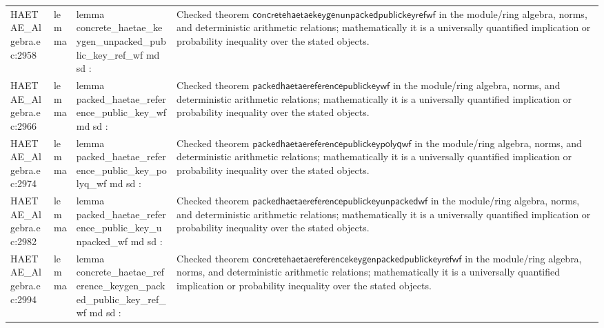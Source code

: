 \documentclass[10pt]{article}
\begin{document}
\begin{longtable}{L{0.11\textwidth}L{0.055\textwidth}L{0.385\textwidth}L{0.41\textwidth}}
HAETAE\_\allowbreak{}Algebra.\allowbreak{}ec:\allowbreak{}2958 & lemma & {\ttfamily\scriptsize lemma concrete\_\allowbreak{}haetae\_\allowbreak{}keygen\_\allowbreak{}unpacked\_\allowbreak{}public\_\allowbreak{}key\_\allowbreak{}ref\_\allowbreak{}wf md sd :} & Checked theorem $\mathsf{concretehaetaekeygenunpackedpublickeyrefwf}$ in the module/ring algebra, norms, and deterministic arithmetic relations; mathematically it is a universally quantified implication or probability inequality over the stated objects. \\
HAETAE\_\allowbreak{}Algebra.\allowbreak{}ec:\allowbreak{}2966 & lemma & {\ttfamily\scriptsize lemma packed\_\allowbreak{}haetae\_\allowbreak{}reference\_\allowbreak{}public\_\allowbreak{}key\_\allowbreak{}wf md sd :} & Checked theorem $\mathsf{packedhaetaereferencepublickeywf}$ in the module/ring algebra, norms, and deterministic arithmetic relations; mathematically it is a universally quantified implication or probability inequality over the stated objects. \\
HAETAE\_\allowbreak{}Algebra.\allowbreak{}ec:\allowbreak{}2974 & lemma & {\ttfamily\scriptsize lemma packed\_\allowbreak{}haetae\_\allowbreak{}reference\_\allowbreak{}public\_\allowbreak{}key\_\allowbreak{}polyq\_\allowbreak{}wf md sd :} & Checked theorem $\mathsf{packedhaetaereferencepublickeypolyqwf}$ in the module/ring algebra, norms, and deterministic arithmetic relations; mathematically it is a universally quantified implication or probability inequality over the stated objects. \\
HAETAE\_\allowbreak{}Algebra.\allowbreak{}ec:\allowbreak{}2982 & lemma & {\ttfamily\scriptsize lemma packed\_\allowbreak{}haetae\_\allowbreak{}reference\_\allowbreak{}public\_\allowbreak{}key\_\allowbreak{}unpacked\_\allowbreak{}wf md sd :} & Checked theorem $\mathsf{packedhaetaereferencepublickeyunpackedwf}$ in the module/ring algebra, norms, and deterministic arithmetic relations; mathematically it is a universally quantified implication or probability inequality over the stated objects. \\
HAETAE\_\allowbreak{}Algebra.\allowbreak{}ec:\allowbreak{}2994 & lemma & {\ttfamily\scriptsize lemma concrete\_\allowbreak{}haetae\_\allowbreak{}reference\_\allowbreak{}keygen\_\allowbreak{}packed\_\allowbreak{}public\_\allowbreak{}key\_\allowbreak{}ref\_\allowbreak{}wf md sd :} & Checked theorem $\mathsf{concretehaetaereferencekeygenpackedpublickeyrefwf}$ in the module/ring algebra, norms, and deterministic arithmetic relations; mathematically it is a universally quantified implication or probability inequality over the stated objects. \\

\end{longtable}
\end{document}
